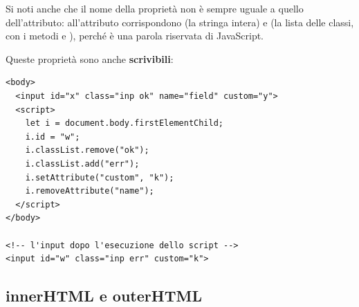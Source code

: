 Si noti anche che il nome della proprietà non è sempre uguale a quello
dell'attributo: all'attributo  corrispondono  (la
stringa intera) e  (la lista delle classi, con i metodi
 e ), perché  è una parola riservata di
JavaScript.

Queste proprietà sono anche \textbf{scrivibili}:

\begin{affianco}[0.52][c]
\codicepiccolo
\begin{lstlisting}[style=html, name=attributi-scrittura.html]
<body>
  <input id="x" class="inp ok" name="field" custom="y">
  <script>
    let i = document.body.firstElementChild;
    i.id = "w";
    i.classList.remove("ok");
    i.classList.add("err");
    i.setAttribute("custom", "k");
    i.removeAttribute("name");
  </script>
</body>

<!-- l'input dopo l'esecuzione dello script -->
<input id="w" class="inp err" custom="k">
\end{lstlisting}
\risultato
\begin{immagine}
\end{immagine}
\end{affianco}

\subsection{innerHTML e outerHTML}

